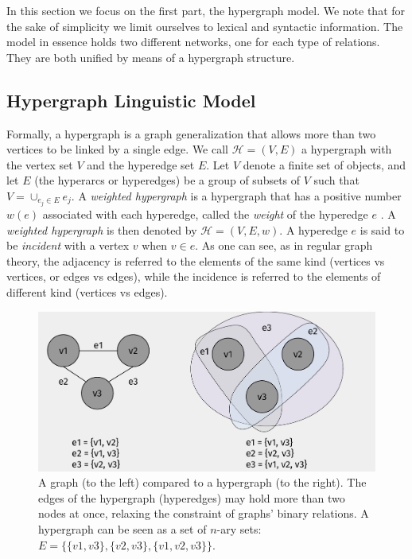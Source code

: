 In this section we focus on the first part, the hypergraph model. We note that for the sake of simplicity we limit ourselves to lexical and syntactic information. The model in essence holds two different networks, one for each type of relations. They are both unified by means of a hypergraph structure. 

\subsection{Hypergraph Linguistic Model}\label{sec:ling_model} 

 Formally, a hypergraph \cite{Berge1985}  is a graph generalization  that allows more than two vertices to be linked by a single edge.  We call $\mathcal{H}=(V,E)$ a {hypergraph}
 with the {vertex} set $V$ and the hyperedge set $E$. Let $V$ denote a finite set of objects, and let $E$  (the hyperarcs or hyperedges) be a
group of subsets  of $V$ such that $V = \cup_{e_j \in E}e_j$.
A \emph{weighted hypergraph} is a hypergraph that has a positive number $w(e)$ associated with each hyperedge, called the \emph{weight} of the hyperedge $e$ . A \emph{weighted hypergraph} is then denoted by $\mathcal{H}=(V,E,w)$.
%
A hyperedge $e$ is said to be \emph{incident} with a vertex $v$ when
$v \in e$.
 As one can see, as in regular graph theory, the adjacency is referred to the elements of the same kind (vertices vs vertices, or edges vs edges), while the incidence is referred to the elements of different kind (vertices vs edges).

\begin{figure}
\centering
\includegraphics[width=0.7\linewidth]{images/Chapitre3/graph_vs_hgraph.pdf}
\caption{A graph (to the left) compared to a hypergraph (to the right). The edges of the hypergraph (hyperedges) may hold more than two nodes at once, relaxing the constraint of graphs' binary relations. A hypergraph can be seen as a set of $n$-ary sets: $E=\{\{v1,v3\},\{v2,v3\},\{v1,v2,v3\}\}$.}
\label{fig:graph_vs_hgraph}
\end{figure}


